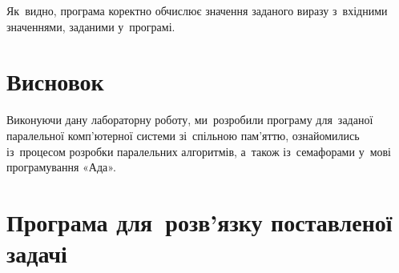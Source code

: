 \documentclass[
  a4paper,
  oneside,
  BCOR = 10mm,
  DIV = 12,
  12pt,
  headings = normal,
]{scrartcl}
\begin{document}
      Як~видно, програма коректно обчислює значення заданого виразу з~вхідними значеннями, заданими у~програмі.

  \section{Висновок}
    Виконуючи дану лабораторну роботу, ми~розробили програму для~заданої паралельної комп'ютерної системи зі~спільною пам'яттю, ознайомились із~процесом розробки паралельних алгоритмів, а~також із~семафорами у~мові програмування «Ада». 

  \newpage
  \appendix
  \section{Програма для~розв'язку поставленої задачі}

\end{document}
